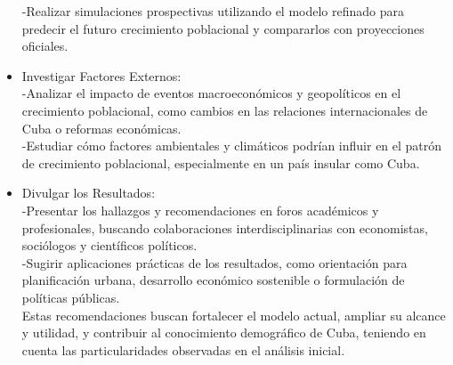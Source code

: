 \documentclass[a4paper,10pt,twocolumn]{article}
\begin{document}
\begin{itemize}
-Realizar simulaciones prospectivas utilizando el modelo refinado para predecir el futuro crecimiento poblacional y compararlos con proyecciones oficiales.\\
	\item Investigar Factores Externos:\\ 
-Analizar el impacto de eventos macroeconómicos y geopolíticos en el crecimiento poblacional, como cambios en las relaciones internacionales de Cuba o reformas económicas.\\
-Estudiar cómo factores ambientales y climáticos podrían influir en el patrón de crecimiento poblacional, especialmente en un país insular como Cuba.
	\item Divulgar los Resultados:\\
-Presentar los hallazgos y recomendaciones en foros académicos y profesionales, buscando colaboraciones interdisciplinarias con economistas, sociólogos y científicos políticos.\\
-Sugirir aplicaciones prácticas de los resultados, como orientación para planificación urbana, desarrollo económico sostenible o formulación de políticas públicas.\\
Estas recomendaciones buscan fortalecer el modelo actual, ampliar su alcance y utilidad, y contribuir al conocimiento demográfico de Cuba, teniendo en cuenta las particularidades observadas en el análisis inicial.
\end{itemize}


\end{document}
